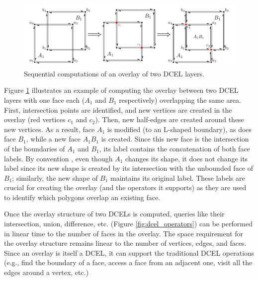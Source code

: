 \begin{figure}
    \centering
    \includegraphics[width=\linewidth]{chapterSDCEL/dcel2}
    \caption{Sequential computations of an overlay of two DCEL layers.}\label{fig:dcel_seq}
\end{figure}

Figure \ref{fig:dcel_seq} illustrates an example of computing the overlay between two DCEL layers with one face each ($A_1$ and $B_1$ respectively) overlapping 
the same area. First, intersection points are identified, and new vertices are created in the overlay (red vertices $c_1$ and $c_2$). Then, new half-edges are 
created around these new vertices. As a result, face $A_1$ is modified (to an L-shaped boundary), as does face $B_1$, while a new face $A_1B_1$ is created. 
Since this new face is the intersection of the boundaries of $A_1$ and $B_1$, its label contains the concatenation of both face labels. By convention 
\cite{berg_computational_2008}, even though $A_1$ changes its shape, it does not change its label since its new shape is created by its intersection with the 
unbounded face of $B_1$; similarly, the new shape of $B_1$ maintains its original label. These labels are crucial for creating the overlay (and the operators it 
supports) as they are used to identify which polygons overlap an existing face.

Once the overlay structure of two DCELs is computed, queries like their intersection, union, difference, etc. (Figure \ref{fig:dcel_operators}) can be performed 
in linear time to the number of faces in the overlay. The space requirement for the overlay structure remains linear to the number of vertices, edges, and 
faces. Since an overlay is itself a DCEL, it can support the traditional DCEL operations (e.g., find the boundary of a face, access a face from an adjacent one, 
visit all the edges around a vertex, etc.)

